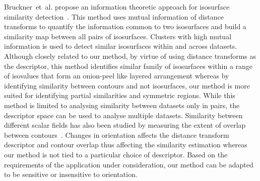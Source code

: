 \documentclass[review,journal]{vgtc}         %
\begin{document}
Bruckner~et~al. propose an information theoretic approach for isosurface similarity 
detection~\cite{BrucknerM10,haidacher11}. This method uses mutual information of distance 
transforms to quantify the information common to two isosurfaces and build a similarity map 
between all pairs of isosurfaces. Clusters with high mutual information is used to detect 
similar isosurfaces within and across datasets. Although closely related to our method, 
by virtue of using distance transforms as the descriptor, 
this method identifies similar family of isosurfaces within a range of isovalues that 
form an onion-peel like layered arrangement whereas by identifying
similarity between contours and not isosurfaces, our method is more suited for identifying partial 
similarities and symmetric regions. While this method is limited to analysing similarity between
datasets only in pairs, the descriptor space can be used to analyse multiple datasets.
Similarity between different scalar fields has also been studied by measuring the extent of overlap
between contours~\cite{SchneiderWCHS08,schn13}. Changes in orientation affects the distance transform
descriptor and contour overlap thus affecting the similarity estimation whereas our method is not tied 
to a particular choice of descriptor. Based on the requirements of the application under 
consideration, our method  can be adapted to be sensitive or insensitive to orientation. 
\end{document}
